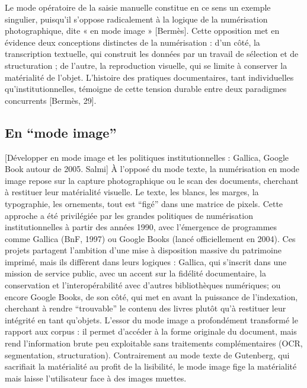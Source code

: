Le mode opératoire de la saisie manuelle constitue en ce sens un exemple singulier, puisqu’il s’oppose radicalement à la logique de la numérisation photographique, dite « en mode image » [Bermès]. Cette opposition met en évidence deux conceptions distinctes de la numérisation : d’un côté, la transcription textuelle, qui construit les données par un travail de sélection et de structuration ; de l’autre, la reproduction visuelle, qui se limite à conserver la matérialité de l’objet. L’histoire des pratiques documentaires, tant individuelles qu’institutionnelles, témoigne de cette tension durable entre deux paradigmes concurrents [Bermès, 29].

\subsection{En \enquote{mode image}}

[Développer en mode image et les politiques institutionnelles : Gallica, Google Book autour de 2005. Salmi] À l’opposé du mode texte, la numérisation en mode image repose sur la capture photographique ou le scan des documents, cherchant à restituer leur matérialité visuelle. Le texte, les blancs, les marges, la typographie, les ornements, tout est \enquote{figé} dans une matrice de pixels. Cette approche a été privilégiée par les grandes politiques de numérisation institutionnelles à partir des années 1990, avec l’émergence de programmes comme Gallica (BnF, 1997) ou Google Books (lancé officiellement en 2004). Ces projets partagent l’ambition d’une mise à disposition massive du patrimoine imprimé, mais ils diffèrent dans leurs logiques : Gallica, qui s’inscrit dans une mission de service public, avec un accent sur la fidélité documentaire, la conservation et l’interopérabilité avec d’autres bibliothèques numériques; ou encore Google Books, de son côté, qui met en avant la puissance de l’indexation, cherchant à rendre \enquote{trouvable} le contenu des livres plutôt qu’à restituer leur intégrité en tant qu’objets. L’essor du mode image a profondément transformé le rapport aux corpus : il permet d’accéder à la forme originale du document, mais rend l’information brute peu exploitable sans traitements complémentaires (OCR, segmentation, structuration). Contrairement au mode texte de Gutenberg, qui sacrifiait la matérialité au profit de la lisibilité, le mode image fige la matérialité mais laisse l’utilisateur face à des images muettes.

